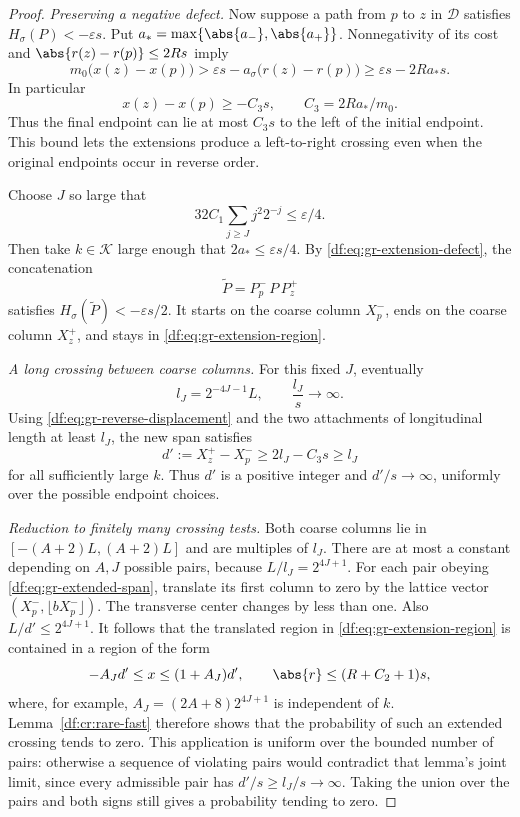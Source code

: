 \begin{proof}
\emph{Preserving a negative defect.}
Now suppose a path from $p$ to $z$ in $\mathcal D$ satisfies
$H_\sigma(P)<-\varepsilon s$. Put
$a_* =\max\{\abs{a_-},\abs{a_+}\}$. Nonnegativity of its cost and
$\abs{r(z)-r(p)}\leq2Rs$ imply
\[
 m_0\bigl(x(z)-x(p)\bigr)
 >\varepsilon s-a_\sigma\bigl(r(z)-r(p)\bigr)
 \geq\varepsilon s-2Ra_*s.
\]
In particular
\begin{equation}\label{df:eq:gr-reverse-displacement}
 x(z)-x(p)\geq-C_3s,\qquad C_3=2Ra_*/m_0.
\end{equation}
Thus the final endpoint can lie at most $C_3s$ to the left of the
initial endpoint. This bound lets the extensions produce a left-to-right
crossing even when the original endpoints occur in reverse order.

Choose $J$ so large that
\[
 32C_1\sum_{j\geq J}j^2 2^{-j}\leq\varepsilon/4.
\]
Then take $k\in\mathcal K$ large enough that $2a_*\leq\varepsilon s/4$.
By \eqref{df:eq:gr-extension-defect}, the concatenation
\[
 \widetilde P=P_p^-\,P\,P_z^+
\]
satisfies $H_\sigma(\widetilde P)<-\varepsilon s/2$. It starts on the coarse
column $X_p^-$, ends on the coarse column $X_z^+$, and stays in
\eqref{df:eq:gr-extension-region}.

\emph{A long crossing between coarse columns.}
For this fixed $J$, eventually
\[
 l_J=2^{-4J-1}L,\qquad \frac{l_J}{s}\longrightarrow\infty.
\]
Using \eqref{df:eq:gr-reverse-displacement} and the two attachments of
longitudinal length at least $l_J$, the new span satisfies
\begin{equation}\label{df:eq:gr-extended-span}
 d':=X_z^+-X_p^-
 \geq2l_J-C_3s\geq l_J
\end{equation}
for all sufficiently large $k$. Thus $d'$ is a positive integer and
$d'/s\to\infty$, uniformly over the possible endpoint choices.

\emph{Reduction to finitely many crossing tests.}
Both coarse columns lie in $[-(A+2)L,(A+2)L]$ and are multiples of
$l_J$. There are at most a constant depending on $A,J$ possible pairs,
because $L/l_J=2^{4J+1}$. For each pair obeying
\eqref{df:eq:gr-extended-span}, translate its first column to zero by the
lattice vector $(X_p^-,\lfloor bX_p^-\rfloor)$. The transverse center
changes by less than one. Also $L/d'\leq2^{4J+1}$. It follows that the
translated region in \eqref{df:eq:gr-extension-region} is contained in a
region of the form
\[
 -A_Jd'\leq x\leq(1+A_J)d',\qquad
 \abs{r}\leq(R+C_2+1)s,
\]
where, for example, $A_J=(2A+8)2^{4J+1}$ is independent of $k$.
Lemma~\ref{df:cr:rare-fast} therefore shows that the probability of such
an extended crossing tends to zero. This application is uniform over
the bounded number of pairs: otherwise a sequence of violating pairs
would contradict that lemma's joint limit, since every admissible pair
has $d'/s\geq l_J/s\to\infty$. Taking the union over the pairs and both
signs still gives a probability tending to zero.


\end{proof}
